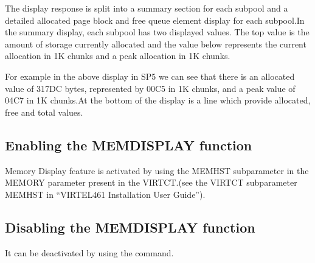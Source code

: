 \documentclass[letterpaper,10pt,english]{sphinxmanual}
\begin{document}
The display response is split into a summary section for each subpool and a detailed allocated page block and free queue element display for each subpool.In the summary display, each subpool has two displayed values. The top value is the amount of storage currently allocated and the value below represents the current allocation in 1K chunks and a peak allocation in 1K chunks.

For example in the above display in SP5 we can see that there is an allocated value of 317DC bytes, represented by 00C5 in 1K chunks, and a peak value of 04C7 in 1K chunks.At the bottom of the display is a line which provide allocated, free and total values.

\ignorespaces 

\subsection{Enabling the MEMDISPLAY function}
\label{\detokenize{audit_operations_ and_performance:enabling-the-memdisplay-function}}\label{\detokenize{audit_operations_ and_performance:index-12}}
Memory Display feature is activated by using the MEMHST subparameter in the MEMORY parameter present in the VIRTCT.(see the VIRTCT subparameter MEMHST in “VIRTEL461 Installation User Guide”).

\ignorespaces 

\subsection{Disabling the MEMDISPLAY function}
\label{\detokenize{audit_operations_ and_performance:disabling-the-memdisplay-function}}\label{\detokenize{audit_operations_ and_performance:index-13}}
It can be deactivated by using the command.

\begin{sphinxVerbatim}[commandchars=\\\{\}]
 
\end{sphinxVerbatim}
\end{document}
